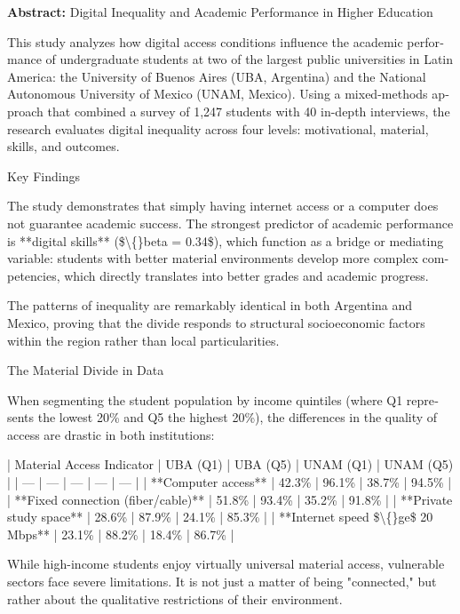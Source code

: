 \documentclass{article}
\begin{document}
\begin{tcolorbox}[colback=brown!8!white,colframe=brown!8!white,boxrule=0pt,arc=2pt,left=4pt,right=4pt,top=3pt,bottom=3pt,before skip=4pt,after skip=4pt]
\begin{otherlanguage}{english}
\sffamily\small \textbf{Abstract:} Digital Inequality and Academic Performance in Higher Education

This study analyzes how digital access conditions influence the academic performance of undergraduate students at two of the largest public universities in Latin America: the University of Buenos Aires (UBA, Argentina) and the National Autonomous University of Mexico (UNAM, Mexico). Using a mixed-methods approach that combined a survey of 1,247 students with 40 in-depth interviews, the research evaluates digital inequality across four levels: motivational, material, skills, and outcomes.

Key Findings

The study demonstrates that simply having internet access or a computer does not guarantee academic success. The strongest predictor of academic performance is **digital skills** (\$\textbackslash\{\}beta = 0.34\$), which function as a bridge or mediating variable: students with better material environments develop more complex competencies, which directly translates into better grades and academic progress.

The patterns of inequality are remarkably identical in both Argentina and Mexico, proving that the divide responds to structural socioeconomic factors within the region rather than local particularities.

The Material Divide in Data

When segmenting the student population by income quintiles (where Q1 represents the lowest 20\% and Q5 the highest 20\%), the differences in the quality of access are drastic in both institutions:

| Material Access Indicator | UBA (Q1) | UBA (Q5) | UNAM (Q1) | UNAM (Q5) |
| --- | --- | --- | --- | --- |
| **Computer access** | 42.3\% | 96.1\% | 38.7\% | 94.5\% |
| **Fixed connection (fiber/cable)** | 51.8\% | 93.4\% | 35.2\% | 91.8\% |
| **Private study space** | 28.6\% | 87.9\% | 24.1\% | 85.3\% |
| **Internet speed \$\textbackslash\{\}ge\$ 20 Mbps** | 23.1\% | 88.2\% | 18.4\% | 86.7\% |

While high-income students enjoy virtually universal material access, vulnerable sectors face severe limitations. It is not just a matter of being "connected," but rather about the qualitative restrictions of their environment.


\end{otherlanguage}
\end{tcolorbox}
\end{document}
